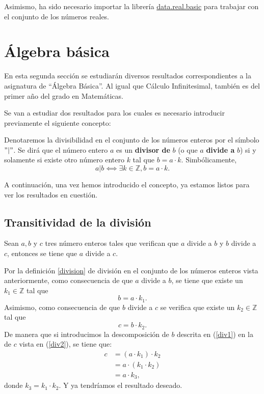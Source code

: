 Asimismo, ha sido necesario importar la librería \href{https://github.com/leanprover-community/mathlib/blob/master/src/data/real/basic.lean}{data.real.basic}
para trabajar con el conjunto de los números reales.

\section{Álgebra básica}

En esta segunda sección se estudiarán diversos resultados
correspondientes a la asignatura de ``Álgebra Básica''.  Al igual que
Cálculo Infinitesimal, también es del primer año del grado en
Matemáticas.

Se van a estudiar dos resultados para los cuales es necesario introducir
previamente el siguiente concepto:
\begin{definicion}\label{division}
  Denotaremos la divisibilidad en el conjunto de los números enteros por
  el símbolo \("|"\). Se dirá que el número entero \(a\) es un
  \textbf{divisor de} \(b\) (o que \(a\) \textbf{divide a} \(b\)) si y
  solamente si existe otro número entero \(k\) tal que \(b = a · k\).
  Simbólicamente,
  \begin{equation}
    a|b ⟺ ∃ k ∈ ℤ, b = a · k.
  \end{equation}
\end{definicion}

A continuación, una vez hemos introducido el concepto, ya estamos listos
para ver los resultados en cuestión.

\subsection{Transitividad de la división}

\begin{teorema}
  Sean \(a, b\) y \(c\) tres número enteros tales que verifican que
  \(a\) divide a \(b\) y \(b\) divide a \(c\), entonces se tiene que
  \(a\) divide a \(c\).
\end{teorema}

\begin{demostracion}
  Por la definición \ref{division} de división en el conjunto de los
  números enteros vista anteriormente, como consecuencia de que \(a\)
  divide a \(b\), se tiene que existe un \(k_1 ∈ ℤ\) tal que
  \begin{equation}\label{div1}
    b = a · k_1.
  \end{equation}
  Asimismo, como consecuencia de que \(b\) divide a \(c\) se verifica
  que existe un \(k_2 ∈ ℤ\) tal que
  \begin{equation}\label{div2}
    c = b · k_2.
  \end{equation}
  De manera que si introducimos la descomposición de \(b\) descrita en
  (\ref{div1}) en la de \(c\) vista en (\ref{div2}), se tiene que:
  \[\begin{array}{ll}
      c & = (a · k_1) · k_2\\
        & = a · (k_1 · k_2) \\
        & = a · k_3,
    \end{array}\]
  donde \(k_3 = k_1 · k_2\). Y ya tendríamos el resultado deseado.
\end{demostracion}

